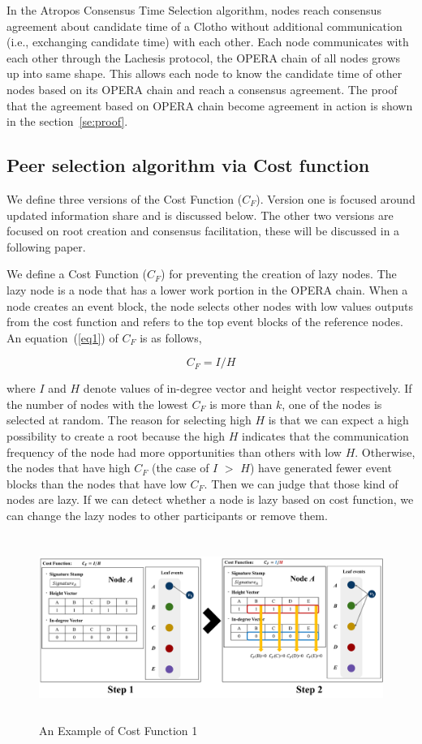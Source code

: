 \documentclass[preprint,12pt]{elsarticle}
\begin{document}
In the Atropos Consensus Time Selection algorithm, nodes reach consensus agreement about candidate time of a Clotho without additional communication (i.e., exchanging candidate time) with each other. Each node communicates with each other through the Lachesis protocol, the OPERA chain of all nodes grows up into same shape. This allows each node to know the candidate time of other nodes based on its OPERA chain and reach a consensus agreement. The proof that the agreement based on OPERA chain become agreement in action is shown in the section~\ref{se:proof}.\\

\subsection{Peer selection algorithm via Cost function}
We define three versions of the Cost Function ($C_F$). Version one is focused around updated information share and is discussed below. The other two versions are focused on root creation and consensus facilitation, these will be discussed in a following paper.


We define a Cost Function ($C_F$) for preventing the creation of lazy nodes. The lazy node is a node that has a lower work portion in the OPERA chain. When a node creates an event block, the node selects other nodes with low values outputs from the cost function and refers to the top event blocks of the reference nodes. An equation~(\ref{eq1}) of $C_F$ is as follows,

\begin{equation}\label{eq1}
C_{F} =I/H
\end{equation}

where $I$ and $H$ denote values of in-degree vector and height vector respectively. If the number of nodes with the lowest $C_F$ is more than $k$, one of the nodes is selected at random. The reason for selecting high $H$ is that we can expect a high possibility to create a root because the high $H$ indicates that the communication frequency of the node had more opportunities than others with low $H$. Otherwise, the nodes that have high $C_F$ (the case of $I$ $>$ $H$) have generated fewer event blocks than the nodes that have low $C_F$. Then we can judge that those kind of nodes are lazy. If we can detect whether a node is lazy based on  cost function, we can change the lazy nodes to other participants or remove them. 

\begin{figure} \centering  
	\includegraphics[height=6cm]{fig_cfEx1}
	\caption{An Example of Cost Function 1}
	\label{fig:cfEx1}
\end{figure}
\end{document}
